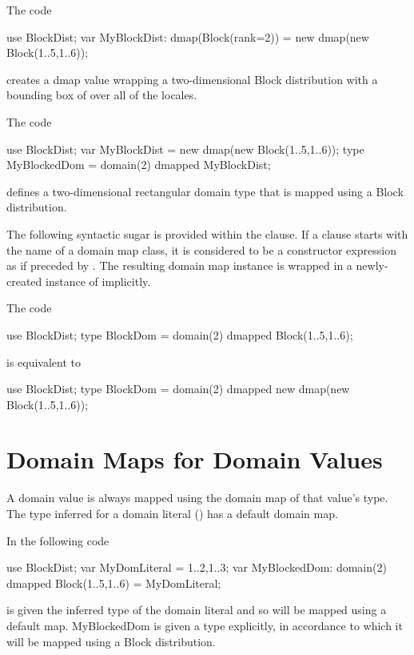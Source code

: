 \begin{example}
The code
\begin{chapel}
use BlockDist;
var MyBlockDist: dmap(Block(rank=2)) = new dmap(new Block({1..5,1..6}));
\end{chapel}
creates a dmap value wrapping a two-dimensional Block distribution with a
bounding box of  over all of the locales.
\end{example}

\begin{example}
The code
\begin{chapel}
use BlockDist;
var MyBlockDist = new dmap(new Block({1..5,1..6}));
type MyBlockedDom = domain(2) dmapped MyBlockDist;
\end{chapel}
defines a two-dimensional rectangular domain type
that is mapped using a Block distribution.
\end{example}

The following syntactic sugar is provided within the  clause.
If a  clause starts with the name of a domain map class,
it is considered to be a constructor expression as if preceded by
. The resulting domain map instance is wrapped in a newly-created
instance of  implicitly.

\begin{example}
The code
\begin{chapel}
use BlockDist;
type BlockDom = domain(2) dmapped Block({1..5,1..6});
\end{chapel}
is equivalent to
\begin{chapel}
use BlockDist;
type BlockDom = domain(2) dmapped new dmap(new Block({1..5,1..6}));
\end{chapel}
\end{example}


\section{Domain Maps for Domain Values}
\label{Domain_Maps_For_Values}

A domain value is always mapped using the domain map of that value's type.
The type inferred for a domain literal ()
has a default domain map.

\begin{example}
In the following code
\begin{chapel}
use BlockDist;
var MyDomLiteral = {1..2,1..3};
var MyBlockedDom: domain(2) dmapped Block({1..5,1..6}) = MyDomLiteral;
\end{chapel}
 is given the inferred type of the domain literal
and so will be mapped using a default map.
MyBlockedDom is given a type explicitly, in accordance to which
it will be mapped using a Block distribution.
\end{example}

